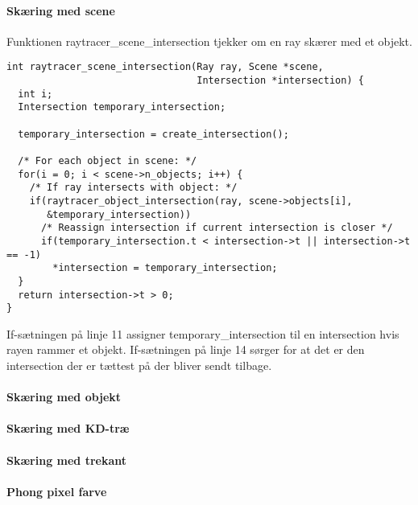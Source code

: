 \paragraph{Skæring med scene}

Funktionen raytracer\_scene\_intersection tjekker om en ray skærer med et objekt.

\begin{lstlisting}[style=Cstyle, caption=Structs til objektet]
int raytracer_scene_intersection(Ray ray, Scene *scene, 
                                 Intersection *intersection) {
  int i;
  Intersection temporary_intersection;

  temporary_intersection = create_intersection();

  /* For each object in scene: */
  for(i = 0; i < scene->n_objects; i++) {
    /* If ray intersects with object: */
    if(raytracer_object_intersection(ray, scene->objects[i], 
       &temporary_intersection))
      /* Reassign intersection if current intersection is closer */
      if(temporary_intersection.t < intersection->t || intersection->t == -1)
        *intersection = temporary_intersection;
  }
  return intersection->t > 0;
}
\end{lstlisting}

If-sætningen på linje 11 assigner temporary\_intersection til en intersection hvis rayen rammer et objekt. If-sætningen på linje 14 sørger for at det er den intersection der er tættest på der bliver sendt tilbage. 


\paragraph{Skæring med objekt}

\paragraph{Skæring med KD-træ}

\paragraph{Skæring med trekant}

\paragraph{Phong pixel farve}



